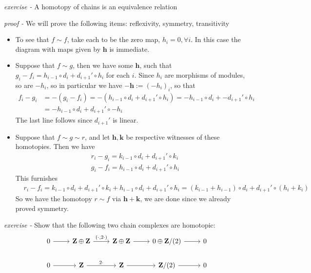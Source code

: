 \documentclass[11pt]{article}
\theoremstyle{definition}
\begin{document}


\emph{exercise - }\label{CCEx2} A homotopy of chains is an equivalence relation

\emph{proof - } We will prove the following items: reflexivity, symmetry, transitivity
\begin{itemize}
    \item To see that \(f \sim f\), take each to be the zero map, \(h_i = 0, \forall i\). In this case the diagram with maps given by \(\mathbf{h}\) is immediate.
    \item Suppose that \(f \sim g\), then we have some \(\mathbf{h}\), such that \(g_i -f_i = h_{i-1}\circ d_i + d_{i+1}' \circ h_i\) for each \(i\). Since \(h_i\) are morphisms of modules, so are \(-h_i\), so in particular we have \(\mathbf{-h} := (-h_i)_i\), so that 
    \begin{align*}
        f_i - g_i &= -(g_i - f_i) = -(h_{i-1}\circ d_i + d_{i+1}' \circ h_i) = -h_{i-1}\circ d_i + -d_{i+1}' \circ h_i \\
        &= -h_{i-1}\circ d_i + d_{i+1}' \circ -h_i
    \end{align*}
    The last line follows since \(d_{i+1}'\) is linear.
    \item Suppose that \(f \sim g \sim r\), and let \(\mathbf{h, k}\) be respective witnesses of these homotopies. Then we have
    \begin{align*}
            &r_i - g_i = k_{i-1}\circ d_i + d_{i+1}'\circ k_i \\
            &g_i - f_i = h_{i-1}\circ d_i + d_{i+1}'\circ h_i
    \end{align*}
    This furnishes
    \begin{align*}
        &r_i - f_i = k_{i-1}\circ d_i + d_{i+1}'\circ k_i + h_{i-1}\circ d_i + d_{i+1}'\circ h_i
                   = (k_{i-1} + h_{i-1})\circ d_i + d_{i+1}'\circ(h_i + k_i)
    \end{align*}
    So we have the homotopy \(r \sim f\) via \(\mathbf{h} + \mathbf{k}\), we are done since we already proved symmetry.
\end{itemize}




\emph{exercise - }\label{CCEx3} Show that the following two chain complexes are homotopic:
\begin{equation*}
    \begin{tikzcd}
        0 \arrow[r] & \mathbf{Z} \oplus \mathbf{Z} \arrow[r,"{(\cdot , 2\cdot)}"] & \mathbf{Z} \oplus \mathbf{Z} \arrow[r] & 0 \oplus \mathbf{Z}/(2) \arrow[r] & 0 \\
        0 \arrow[r] & \mathbf{Z} \arrow[r,"2\cdot"] & \mathbf{Z} \arrow[r] & \mathbf{Z}/(2) \arrow[r] & 0
    \end{tikzcd}
\end{equation*}
\end{document}
